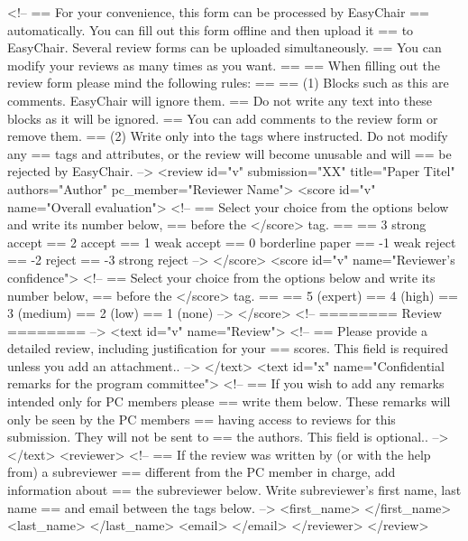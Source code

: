 <!--
  == For your convenience, this form can be processed by EasyChair
  == automatically. You can fill out this form offline and then upload it
  == to EasyChair. Several review forms can be uploaded simultaneously.
  == You can modify your reviews as many times as you want.
  ==
  == When filling out the review form please mind the following rules:
  ==
  == (1) Blocks such as this are comments. EasyChair will ignore them.
  ==     Do not write any text into these blocks as it will be ignored.
  ==     You can add comments to the review form or remove them.
  == (2) Write only into the tags where instructed. Do not modify any
  ==     tags and attributes, or the review will become unusable and will
  ==     be rejected by EasyChair.
  -->
<review id="v"
        submission="XX"
        title="Paper Titel"
        authors="Author"
        pc_member="Reviewer Name">
<score id="v" name="Overall evaluation">
<!--
  == Select your choice from the options below and write its number below,
  == before the </score> tag.
  ==
  == 3 strong accept
  == 2 accept
  == 1 weak accept
  == 0 borderline paper
  == -1 weak reject
  == -2 reject
  == -3 strong reject
  -->
</score>
<score id="v" name="Reviewer's confidence">
<!--
  == Select your choice from the options below and write its number below,
  == before the </score> tag.
  ==
  == 5 (expert)
  == 4 (high)
  == 3 (medium)
  == 2 (low)
  == 1 (none)
  -->
</score>
<!-- ======== Review ======== -->
<text id="v" name="Review">
<!--
  == Please provide a detailed review, including justification for your
  == scores. This field is required unless you add an attachment..
  -->
</text>
<text id="x" name="Confidential remarks for the program committee">
<!--
  == If you wish to add any remarks intended only for PC members please
  == write them below. These remarks will only be seen by the PC members
  == having access to reviews for this submission. They will not be sent to
  == the authors. This field is optional..
  -->
</text>
<reviewer>
  <!--
    == If the review was written by (or with the help from) a subreviewer
    == different from the PC member in charge, add information about
    == the subreviewer below. Write subreviewer's first name, last name
    == and email between the tags below.
    -->
  <first_name>  </first_name>
  <last_name>   </last_name>
  <email>  </email>
</reviewer>
</review>
